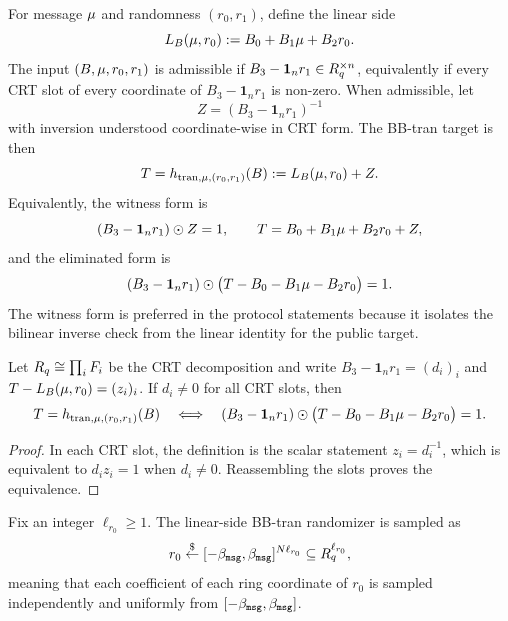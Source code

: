 For message $\mathbf{\mu}$ and randomness $(r_0,r_1)$, define the linear side
\begin{equation}
  L_B(\mathbf{\mu},r_0):=B_0+B_1\mathbf{\mu}+B_2r_0.
  \label{eq:htran-linear-side}
\end{equation}
The input $(B,\mathbf{\mu},r_0,r_1)$ is admissible if $B_3-\mathbf 1_n r_1\in R_q^{\times n}$, equivalently if
every CRT slot of every coordinate of $B_3-\mathbf 1_n r_1$ is non-zero.  When admissible, let
\[
  Z=(B_3-\mathbf 1_n r_1)^{-1}
\]
with inversion understood coordinate-wise in CRT form.  The BB-tran target is then
\begin{equation}
  T=h_{\mathrm{tran},\mathbf{\mu},(r_0,r_1)}(B):=L_B(\mathbf{\mu},r_0)+Z.
  \label{eq:htran-target}
\end{equation}
Equivalently, the witness form is
\begin{equation}
  (B_3-\mathbf 1_n r_1)\odot Z=1,
  \qquad
  T=B_0+B_1\mathbf{\mu}+B_2r_0+Z,
  \label{eq:htran-witness-form}
\end{equation}
and the eliminated form is
\begin{equation}
  (B_3-\mathbf 1_n r_1)\odot\bigl(T-B_0-B_1\mathbf{\mu}-B_2r_0\bigr)=1.
  \label{eq:htran-eliminated}
\end{equation}
The witness form is preferred in the protocol statements because it isolates the bilinear inverse check from
the linear identity for the public target.

\begin{lemma}\label{lem:hash-cleared-admissible}
Let $R_q\cong\prod_i F_i$ be the CRT decomposition and write $B_3-\mathbf 1_n r_1=(d_i)_i$ and
$T-L_B(\mathbf{\mu},r_0)=(z_i)_i$.  If $d_i\neq 0$ for all CRT slots, then
\[
  T=h_{\mathrm{tran},\mathbf{\mu},(r_0,r_1)}(B)
  \quad\Longleftrightarrow\quad
  (B_3-\mathbf 1_n r_1)\odot\bigl(T-B_0-B_1\mathbf{\mu}-B_2r_0\bigr)=1.
\]
\end{lemma}

\begin{proof}
In each CRT slot, the definition is the scalar statement $z_i=d_i^{-1}$, which is equivalent to $d_i z_i=1$
when $d_i\neq 0$.  Reassembling the slots proves the equivalence.
\end{proof}

\begin{definition}\label{def:htran-long-r0}
Fix an integer $\ell_{r_0}\ge 1$.  The linear-side BB-tran randomizer is sampled as
\[
  r_0\overset{\$}{\leftarrow} [-\beta_{\mathtt{msg}},\beta_{\mathtt{msg}}]^{N\ell_{r_0}}\subseteq R_q^{\ell_{r_0}},
\]
meaning that each coefficient of each ring coordinate of $r_0$ is sampled independently and uniformly from
$[-\beta_{\mathtt{msg}},\beta_{\mathtt{msg}}]$.
\end{definition}

